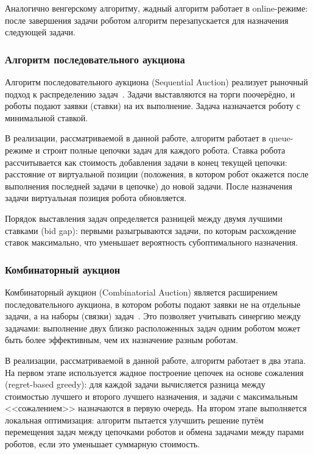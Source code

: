 Аналогично венгерскому алгоритму, жадный алгоритм работает в online-режиме: после завершения задачи роботом алгоритм перезапускается для назначения следующей задачи.

\subsubsection{Алгоритм последовательного аукциона}

Алгоритм последовательного аукциона (Sequential Auction) реализует рыночный подход к распределению задач~\cite{dias2006market}. Задачи выставляются на торги поочерёдно, и роботы подают заявки (ставки) на их выполнение. Задача назначается роботу с минимальной ставкой.

В реализации, рассматриваемой в данной работе, алгоритм работает в queue-режиме и строит полные цепочки задач для каждого робота. Ставка робота рассчитывается как стоимость добавления задачи в конец текущей цепочки: расстояние от виртуальной позиции (положения, в котором робот окажется после выполнения последней задачи в цепочке) до новой задачи. После назначения задачи виртуальная позиция робота обновляется.

Порядок выставления задач определяется разницей между двумя лучшими ставками (bid gap): первыми разыгрываются задачи, по которым расхождение ставок максимально, что уменьшает вероятность субоптимального назначения.

\subsubsection{Комбинаторный аукцион}

Комбинаторный аукцион (Combinatorial Auction) является расширением последовательного аукциона, в котором роботы подают заявки не на отдельные задачи, а на наборы (связки) задач~\cite{dias2006market}. Это позволяет учитывать синергию между задачами: выполнение двух близко расположенных задач одним роботом может быть более эффективным, чем их назначение разным роботам.

В реализации, рассматриваемой в данной работе, алгоритм работает в два этапа. На первом этапе используется жадное построение цепочек на основе сожаления (regret-based greedy): для каждой задачи вычисляется разница между стоимостью лучшего и второго лучшего назначения, и задачи с максимальным <<сожалением>> назначаются в первую очередь. На втором этапе выполняется локальная оптимизация: алгоритм пытается улучшить решение путём перемещения задач между цепочками роботов и обмена задачами между парами роботов, если это уменьшает суммарную стоимость.

